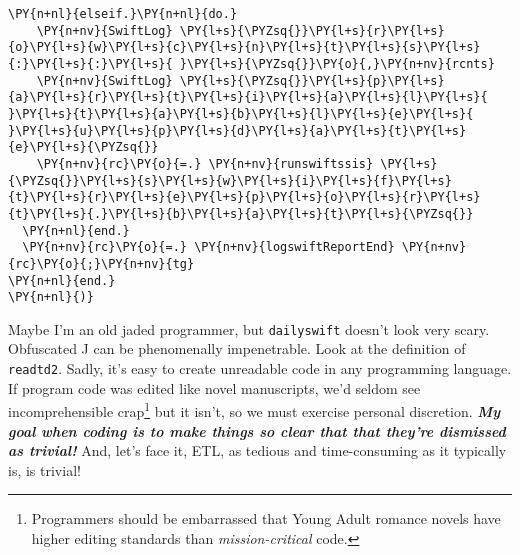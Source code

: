 \begin{tcolorbox}[breakable, size=fbox, boxrule=1pt, pad at break*=1mm,colback=cellbackground, colframe=cellborder]
\begin{Verbatim}[commandchars=\\\{\}]
  \PY{n+nl}{elseif.}\PY{n+nl}{do.} 
    \PY{n+nv}{SwiftLog} \PY{l+s}{\PYZsq{}}\PY{l+s}{r}\PY{l+s}{o}\PY{l+s}{w}\PY{l+s}{c}\PY{l+s}{n}\PY{l+s}{t}\PY{l+s}{s}\PY{l+s}{:}\PY{l+s}{:}\PY{l+s}{ }\PY{l+s}{\PYZsq{}}\PY{o}{,}\PY{n+nv}{rcnts}   
    \PY{n+nv}{SwiftLog} \PY{l+s}{\PYZsq{}}\PY{l+s}{p}\PY{l+s}{a}\PY{l+s}{r}\PY{l+s}{t}\PY{l+s}{i}\PY{l+s}{a}\PY{l+s}{l}\PY{l+s}{ }\PY{l+s}{t}\PY{l+s}{a}\PY{l+s}{b}\PY{l+s}{l}\PY{l+s}{e}\PY{l+s}{ }\PY{l+s}{u}\PY{l+s}{p}\PY{l+s}{d}\PY{l+s}{a}\PY{l+s}{t}\PY{l+s}{e}\PY{l+s}{\PYZsq{}}   
    \PY{n+nv}{rc}\PY{o}{=.} \PY{n+nv}{runswiftssis} \PY{l+s}{\PYZsq{}}\PY{l+s}{s}\PY{l+s}{w}\PY{l+s}{i}\PY{l+s}{f}\PY{l+s}{t}\PY{l+s}{r}\PY{l+s}{e}\PY{l+s}{p}\PY{l+s}{o}\PY{l+s}{r}\PY{l+s}{t}\PY{l+s}{.}\PY{l+s}{b}\PY{l+s}{a}\PY{l+s}{t}\PY{l+s}{\PYZsq{}}
  \PY{n+nl}{end.}
  \PY{n+nv}{rc}\PY{o}{=.} \PY{n+nv}{logswiftReportEnd} \PY{n+nv}{rc}\PY{o}{;}\PY{n+nv}{tg}
\PY{n+nl}{end.}
\PY{n+nl}{)}
\end{Verbatim}
\end{tcolorbox}

    Maybe I'm an old jaded programmer, but \texttt{dailyswift} doesn't look
very scary. Obfuscated J can be phenomenally impenetrable. Look at the
definition of \texttt{readtd2}. Sadly, it's easy to create unreadable
code in any programming language. If program code was edited like novel
manuscripts, we'd seldom see incomprehensible
crap\footnote{Programmers should be embarrassed that Young Adult romance novels have higher editing standards than \emph{mission-critical} code.}
but it isn't, so we must exercise personal discretion. \textbf{\emph{My
goal when coding is to make things so clear that that they're dismissed
as trivial!}} And, let's face it, ETL, as tedious and time-consuming as
it typically is, is trivial!
  
    
%
